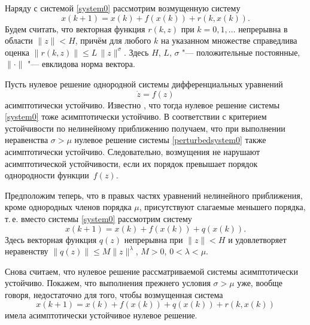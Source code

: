Наряду с системой \eqref{system0} рассмотрим возмущенную систему
\begin{equation}
x(k+1)=x(k)+f(x(k))+r(k,x(k)).\label{perturbedsystem0}
\end{equation}
Будем считать, что  векторная функция  $r(k, z)$ при $k=0, 1, \ldots$
непрерывна в области $\|z\|<H$, причём для любого $k$ на указанном
множестве справедлива оценка  $\|r(k, z)\|\leq L \, \|z\|^\sigma$.
Здесь $H$, $L$, $\sigma$ "--- положительные постоянные, $\|\cdot\|$ "---
евклидова норма вектора.

Пусть нулевое решение однородной системы дифференциальных
уравнений
$$\dot{z}=f(z)$$
асимптотически устойчиво. Известно \cite[с.~62]{sultan:bib8}, что тогда нулевое
решение системы \eqref{system0} тоже асимптотически устойчиво. В
соответствии с критерием устойчивости по нелинейному
приближению  \cite[с.~70]{sultan:bib8} получаем, что при выполнении неравенства
$\sigma>\mu$ нулевое решение системы \eqref{perturbedsystem0}
также асимптотически устойчиво. Следовательно, возмущения не
нарушают асимптотической устойчивости, если их порядок превышает
порядок однородности функции~$f(z)$.

Предположим теперь, что в правых частях уравнений нелинейного
приближения, кроме однородных членов порядка $\mu$, присутствуют
слагаемые меньшего порядка, т.\,е. вместо системы \eqref{system0}
рассмотрим систему
\begin{equation}
x(k+1)=x(k)+f(x(k))+q(x(k))\label{system01}.
\end{equation}
Здесь векторная функция $q(z)$  непрерывна при $\|z\|<H$ и
удовлетворяет неравенству $\|q(z)\|\leq M \|z\|^\lambda$, $M>0$,
$0<\lambda<\mu$.

Снова считаем, что нулевое решение рассматриваемой системы
асимптотически устойчиво. Покажем, что выполнения прежнего
условия $\sigma>\mu$  уже, вообще говоря, недостаточно для того,
чтобы возмущенная система
\begin{equation}
x(k+1)=x(k)+f(x(k))+q(x(k))+r(k, x(k)) \label{perturbedsystem01}
\end{equation}
имела асимптотически устойчивое нулевое решение.


